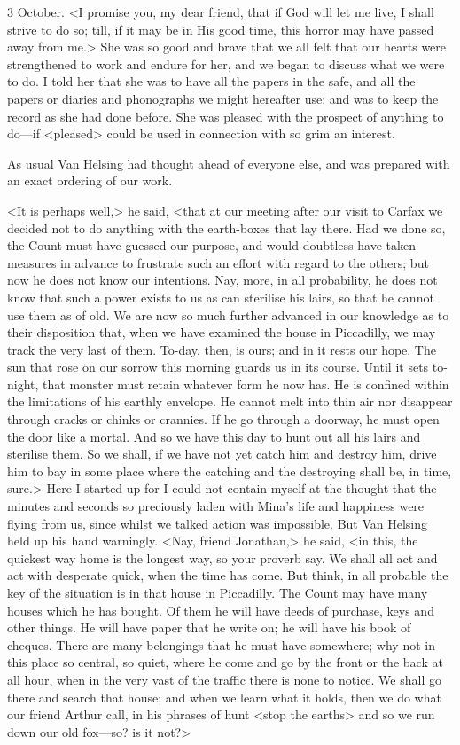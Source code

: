 \begin{diary}{3 October.}
<I promise you, my dear friend, that if God will let me live, I shall strive to do so; till, if it may be in His good time, this horror may have passed away from me.> She was so good and brave that we all felt that our hearts were strengthened to work and endure for her, and we began to discuss what we were to do. I told her that she was to have all the papers in the safe, and all the papers or diaries and phonographs we might hereafter use; and was to keep the record as she had done before. She was pleased with the prospect of anything to do—if <pleased> could be used in connection with so grim an interest.

As usual Van Helsing had thought ahead of everyone else, and was prepared with an exact ordering of our work.

<It is perhaps well,> he said, <that at our meeting after our visit to Carfax we decided not to do anything with the earth-boxes that lay there. Had we done so, the Count must have guessed our purpose, and would doubtless have taken measures in advance to frustrate such an effort with regard to the others; but now he does not know our intentions. Nay, more, in all probability, he does not know that such a power exists to us as can sterilise his lairs, so that he cannot use them as of old. We are now so much further advanced in our knowledge as to their disposition that, when we have examined the house in Piccadilly, we may track the very last of them. To-day, then, is ours; and in it rests our hope. The sun that rose on our sorrow this morning guards us in its course. Until it sets to-night, that monster must retain whatever form he now has. He is confined within the limitations of his earthly envelope. He cannot melt into thin air nor disappear through cracks or chinks or crannies. If he go through a doorway, he must open the door like a mortal. And so we have this day to hunt out all his lairs and sterilise them. So we shall, if we have not yet catch him and destroy him, drive him to bay in some place where the catching and the destroying shall be, in time, sure.> Here I started up for I could not contain myself at the thought that the minutes and seconds so preciously laden with Mina's life and happiness were flying from us, since whilst we talked action was impossible. But Van Helsing held up his hand warningly. <Nay, friend Jonathan,> he said, <in this, the quickest way home is the longest way, so your proverb say. We shall all act and act with desperate quick, when the time has come. But think, in all probable the key of the situation is in that house in Piccadilly. The Count may have many houses which he has bought. Of them he will have deeds of purchase, keys and other things. He will have paper that he write on; he will have his book of cheques. There are many belongings that he must have somewhere; why not in this place so central, so quiet, where he come and go by the front or the back at all hour, when in the very vast of the traffic there is none to notice. We shall go there and search that house; and when we learn what it holds, then we do what our friend Arthur call, in his phrases of hunt <stop the earths> and so we run down our old fox—so? is it not?>


\end{diary}
